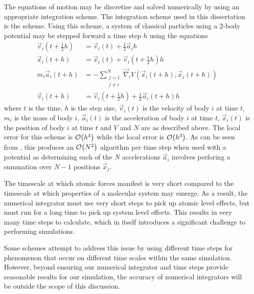%
The equations of motion may be discretise and solved numerically
by using an appropriate integration scheme.
%
The integration scheme used in this dissertation is
the \velocityverlet{} scheme.
%
Using this scheme, a system of classical particles using a 2-body potential
may be stepped forward a time step $h$ using the equations
%
\begin{subequations}
\label{eqn:velocity_verlet_scheme}
\begin{align}
    \vec{v}_i(t + \tfrac{1}{2} h) &=
        \vec{v}_i(t) + \tfrac{1}{2}\vec{a}_i h
    \\
    \vec{x}_i(t + h) &=
        \vec{x}_i(t) + \vec{v}_i(t + \tfrac{1}{2} h) h
    \\
    m_i \vec{a}_i(t + h) &=
        - \sum_{\substack{j=1\\j\ne{}i}}^N
            \vec{\nabla}_i V(\vec{x}_i(t+h), \vec{x}_j(t+h))
    \label{eqn:velocity_verlet_force_eval}
    \\
    \vec{v}_i(t+h) &=
        \vec{v}_i(t + \tfrac{1}{2} h) + \tfrac{1}{2} \vec{a}_i(t + h) h
\end  {align}
\end{subequations}
where $t$ is the time,
$h$ is the step size,
$\vec{v}_i(t)$ is the velocity of body $i$ at time $t$,
$m_i$ is the mass of body $i$,
$\vec{a}_i(t)$ is the acceleration of body $i$ at time $t$,
$\vec{x}_i(t)$ is the position of body $i$ at time $t$ and
$V$ and $N$ are as described above.
%
The local error for this scheme is $\mathcal{O}{\left({ h^4 }\right)}$ while the local error
is $\mathcal{O}{\left({ h^3 }\right)}$.
%
As can be seen from
,
this produces an $\mathcal{O}{\left({ N^2 }\right)}$ algorithm per time step
when used with a \twobody{} potential as
determining each of the $N$ accelerations $\vec{a}_i$ involves
perforing a summation over $N-1$ positions $\vec{x}_j$.

%
The timescale at which atomic forces manifest is very short compared to
the timescale at which properties of a molecular system may emerge.
%
As a result, the numerical integrator must use very short steps to
pick up atomic level effects, but must run for a long
time to pick up system level effects.
%
This results in very many time steps to calculate, which
in itself introduces a significant challenge to performing simulations.

Some schemes attempt to address this issue by
using different time steps for phenomenon that occur on
different time scales within the same simulation.
%
However, beyond ensuring our numerical integrator and time steps provide
reasonable results for our simulation,
the accuracy of numerical integrators will be
outside the scope of this discussion.


